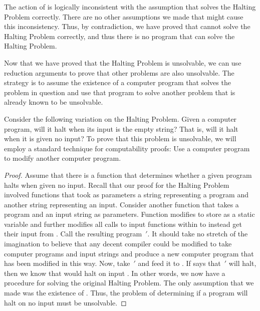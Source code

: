 The action of  is logically inconsistent with the
assumption that  solves the Halting Problem correctly.
There are no other assumptions we made that might cause this
inconsistency.
Thus, by contradiction, we have proved that  cannot solve
the Halting Problem correctly, and thus there is no program that can
solve the Halting Problem.

Now that we have proved that the Halting Problem is unsolvable, we
can use reduction arguments to prove that other problems are also
unsolvable.
The strategy is to assume the existence of a computer program that
solves the problem in question and use that program to solve another
problem that is already known to be unsolvable.

\begin{example}
Consider the following variation on the Halting Problem.
Given a computer program, will it halt when its input is the
empty string?
That is, will it halt when it is given no input?
To prove that this problem is unsolvable, we will employ a standard
technique for computability proofs:
Use a computer program to modify another computer program.

\begin{proof}
Assume that there is a function  that determines whether
a given program halts when given no input.
Recall that our proof for the Halting Problem involved functions that
took as parameters a string representing a program and another string
representing an input.
Consider another function  that takes a program
 and an input string  as parameters.
Function  modifies  to store 
as a static variable  and further modifies all calls
to input functions within  to instead get their input from
.
Call the resulting program \,\('\).
It should take no stretch of the imagination to believe that any
decent compiler could be modified to take computer programs and input
strings and produce a new computer program that has been modified in
this way.
Now, take \,\('\) and feed it to .
If  says that \,\('\) will halt, then we know that
 would halt on input .
In other words, we now have a procedure for solving the original
Halting Problem.
The only assumption that we made was the existence of .
Thus, the problem of determining if a program will halt on no input
must be unsolvable.
\end{proof}
\end{example}

